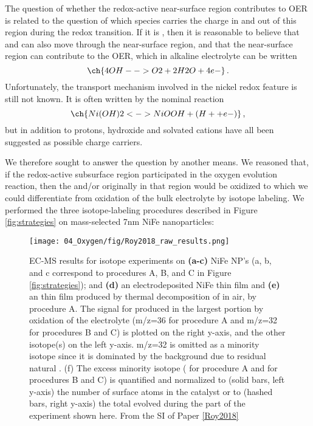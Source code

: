The question of whether the redox-active near-surface region contributes to OER is related to the question of which species carries the charge in and out of this region during the redox transition. If it is , then it is reasonable to believe that  and  can also move through the near-surface region, and that the near-surface region can contribute to the OER, which in alkaline electrolyte can be written
\begin{equation}
\ch{4 OH- -> O2 + 2 H2O + 4 e-}\,.\label{rxn:OER_alkaline}
\end{equation}
Unfortunately, the transport mechanism involved in the nickel redox feature is still not known\cite{Dionigi2016b}. It is often written by the nominal reaction 
\begin{equation}
\ch{Ni(OH)2 <-> NiOOH + (H+ + e- )}\,,\label{rxn:Ni_redox}
\end{equation}
but in addition to protons, hydroxide and solvated cations have all been suggested as possible charge carriers\cite{WehrensDijksma2006}.

We therefore sought to answer the question by another means. We reasoned that, if the redox-active subsurface region participated in the oxygen evolution reaction, then the  and/or  originally in that region would be oxidized to  which we could differentiate from oxidation of the bulk electrolyte by isotope labeling. We performed the three isotope-labeling procedures described in Figure \ref{fig:strategies} on mass-selected 7nm NiFe nanoparticles:


\begin{figure}[h!]
	\centering
	\texttt{[image: 04\_Oxygen/fig/Roy2018\_raw\_results.png]}
	\caption{EC-MS results for isotope experiments on \textbf{(a-c)} NiFe NP’s (a, b, and c correspond to procedures A, B, and C in Figure \ref{fig:strategies}); and \textbf{(d)} an electrodeposited NiFe thin film and \textbf{(e)} an  thin film produced by thermal decomposition of  in air, by procedure A. The signal for  produced in the largest portion by oxidation of the electrolyte (m/z=36 for procedure A and m/z=32 for procedures B and C) is plotted on the right y-axis, and the other  isotope(s) on the left y-axis. m/z=32 is omitted as a minority isotope since it is dominated by the background due to residual natural . (f) The excess minority isotope ( for procedure A and  for procedures B and C) is quantified and normalized to (solid bars, left y-axis) the number of surface atoms in the catalyst or to (hashed bars, right y-axis) the total  evolved during the part of the experiment shown here. From the SI of Paper \ref{Roy2018}}
	\label{fig:Roy2018_raw_results}
\end{figure}

